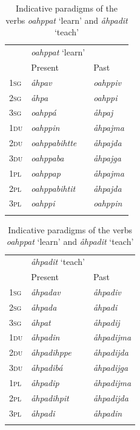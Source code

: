 \documentclass[output=paper,colorlinks,citecolor=brown]{langscibook}
\begin{document}
\begin{table}
\begin{tabularx}{.45\textwidth}{lll}
\lsptoprule
 & \textit{oahppat} ‘learn’ & \\
 & {Present} & {Past}\\
 \midrule
{\textsc{1sg}} & {\itshape åhpav} & {\itshape oahppiv}\\
{\textsc{2sg}} & {\itshape åhpa} & {\itshape oahppi}\\
{\textsc{3sg}} & {\itshape oahppá} & {\itshape åhpaj}\\
{\textsc{1du}} & {\itshape oahppin} & {\itshape åhpajma}\\
{\textsc{2du}} & {\itshape oahppabihtte} & {\itshape åhpajda}\\
{\textsc{3du}} & {\itshape oahppaba} & {\itshape åhpajga}\\
{\textsc{1pl}} & {\itshape oahppap} & {\itshape åhpajma}\\
{\textsc{2pl}} & {\itshape oahppabihtit} & {\itshape åhpajda}\\
{\textsc{3pl}} & {\itshape oahppi} & {\itshape oahppin}\\
\lspbottomrule
\end{tabularx}
\begin{tabularx}{.45\textwidth}{lll}
\lsptoprule
 & \textit{åhpadit} ‘teach’ & \\
 & {Present} & {Past}\\
\midrule 
{\textsc{1sg}} & {\itshape åhpadav} & {\itshape åhpadiv}\\
{\textsc{2sg}} & {\itshape åhpada} & {\itshape åhpadi}\\
{\textsc{3sg}} & {\itshape åhpat} & {\itshape åhpadij}\\
{\textsc{1du}} & {\itshape åhpadin} & {\itshape åhpadijma}\\
{\textsc{2du}} & {\itshape åhpadihppe} & {\itshape åhpadijda}\\
{\textsc{3du}} & {\itshape åhpadibá} & {\itshape åhpadijga}\\
{\textsc{1pl}} & {\itshape åhpadip} & {\itshape åhpadijma}\\
{\textsc{2pl}} & {\itshape åhpadihpit} & {\itshape åhpadijda}\\
{\textsc{3pl}} & {\itshape åhpadi} & {\itshape åhpadin}\\
\lspbottomrule
\end{tabularx}
 \caption{Indicative paradigms of the verbs \textit{oahppat} ‘learn’ and \textit{åhpadit} ‘teach’}
    \label{tab:lul:1}
\end{table}
\end{document}
